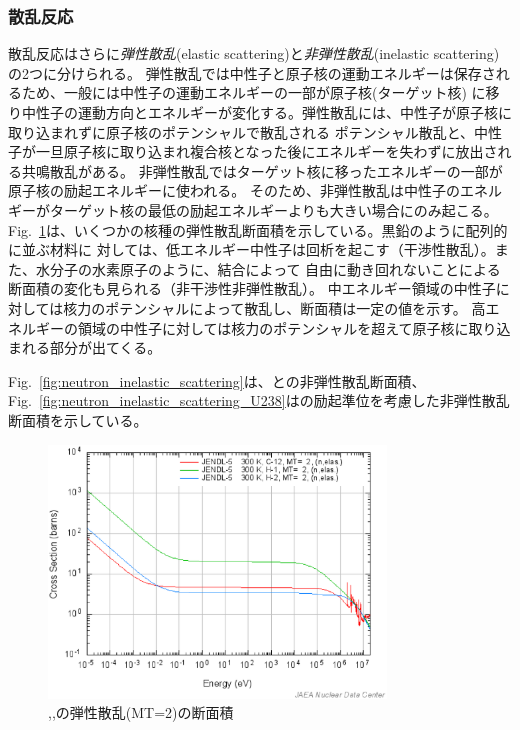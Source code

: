 \subsubsection{散乱反応}
散乱反応はさらに\emph{弾性散乱}(elastic scattering)と\emph{非弾性散乱}(inelastic scattering)の2つに分けられる。
弾性散乱では中性子と原子核の運動エネルギーは保存されるため、一般には中性子の運動エネルギーの一部が原子核(ターゲット核)
に移り中性子の運動方向とエネルギーが変化する。弾性散乱には、中性子が原子核に取り込まれずに原子核のポテンシャルで散乱される
ポテンシャル散乱と、中性子が一旦原子核に取り込まれ複合核となった後にエネルギーを失わずに放出される共鳴散乱がある。
非弾性散乱ではターゲット核に移ったエネルギーの一部が原子核の励起エネルギーに使われる。
そのため、非弾性散乱は中性子のエネルギーがターゲット核の最低の励起エネルギーよりも大きい場合にのみ起こる。
Fig.~\ref{fig:neutron_scattering}は、いくつかの核種の弾性散乱断面積を示している。黒鉛のように配列的に並ぶ材料に
対しては、低エネルギー中性子は回析を起こす（干渉性散乱）。また、水分子の水素原子のように、結合によって
自由に動き回れないことによる断面積の変化も見られる（非干渉性非弾性散乱）。
中エネルギー領域の中性子に対しては核力のポテンシャルによって散乱し、断面積は一定の値を示す。
高エネルギーの領域の中性子に対しては核力のポテンシャルを超えて原子核に取り込まれる部分が出てくる。

Fig.~\ref{fig:neutron_inelastic_scattering}は、との非弾性散乱断面積、
Fig.~\ref{fig:neutron_inelastic_scattering_U238}はの励起準位を考慮した非弾性散乱断面積を示している。


\begin{figure}[htbp]
  \centering
  \includegraphics[width=0.8\textwidth]{figure/CrossSecElastic.eps}
  \caption{,,の弾性散乱(MT=2)の断面積}
  \label{fig:neutron_scattering}
\end{figure}

